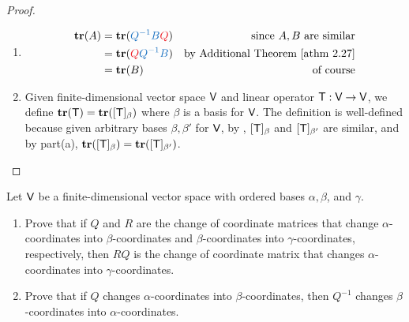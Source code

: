 \begin{proof} \ 

\begin{enumerate}
\item
\begin{align*}
    \TRACE(A) & = \TRACE(\BLUE{Q^{-1}B}\RED{Q}) & \text{since \(A, B\) are similar} \\
              & = \TRACE(\RED{Q}\BLUE{Q^{-1}B}) & \text{by \ATHM{2.27}} \\
              & = \TRACE(B) & \text{of course}
\end{align*}

\item Given finite-dimensional vector space \(\textsf{V}\) and linear operator \(\textsf{T} : \textsf{V} \to \textsf{V}\), we define \(\textbf{tr}(\textsf{T}) = \textbf{tr}([\textsf{T}]_{\beta})\) where \(\beta\) is a basis for \(\textsf{V}\).
The definition is well-defined because given arbitrary bases \(\beta, \beta'\) for \(\textsf{V}\), by , \([\textsf{T}]_{\beta}\) and \([\textsf{T}]_{\beta'}\) are similar, and by part(a), \(\textbf{tr}([\textsf{T}]_{\beta}) = \textbf{tr}([\textsf{T}]_{\beta'})\).
\end{enumerate}
\end{proof}

\begin{exercise} \label{exercise 2.5.11}
Let \(\textsf{V}\) be a finite-dimensional vector space with ordered bases \(\alpha, \beta\), and \(\gamma\).
\begin{enumerate}
\item Prove that if \(Q\) and \(R\) are the change of coordinate matrices that change \(\alpha\)-coordinates into \(\beta\)-coordinates and \(\beta\)-coordinates into \(\gamma\)-coordinates, respectively, then \(RQ\) is the change of coordinate matrix that changes \(\alpha\)-coordinates into \(\gamma\)-coordinates.

\item Prove that if \(Q\) changes \(\alpha\)-coordinates into \(\beta\)-coordinates, then \(Q^{-1}\) changes \(\beta\)-coordinates into \(\alpha\)-coordinates.
\end{enumerate}
\end{exercise}

